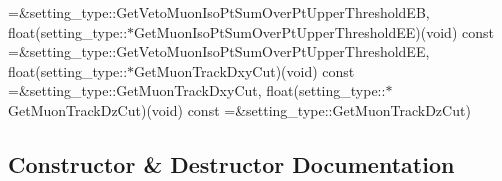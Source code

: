 \begin{DoxyCompactItemize}
=\&setting\_\-type::GetVetoMuonIsoPtSumOverPtUpperThresholdEB, float(setting\_\-type::$\ast$GetMuonIsoPtSumOverPtUpperThresholdEE)(void) const =\&setting\_\-type::GetVetoMuonIsoPtSumOverPtUpperThresholdEE, float(setting\_\-type::$\ast$GetMuonTrackDxyCut)(void) const =\&setting\_\-type::GetMuonTrackDxyCut, float(setting\_\-type::$\ast$GetMuonTrackDzCut)(void) const =\&setting\_\-type::GetMuonTrackDzCut)
\end{DoxyCompactItemize}


\subsection{Constructor \& Destructor Documentation}
\hypertarget{classHttValidVetoMuonsProducer_a7ca92428466a67da2518c2997faf8ca7}{
}
